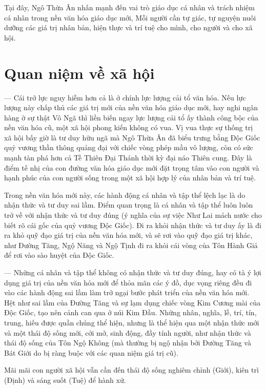 Tại đây, Ngô Thừa Ân nhấn mạnh đến vai trò giáo dục cá nhân và trách nhiệm cá nhân trong nền văn hóa giáo dục mới, Mỗi người cần tự giác, tự nguyện nuôi dưỡng các giá trị nhân bản, hiện thực và trí tuệ cho mình, cho người và cho xã hội.

\section{Quan niệm về xã hội} %
\label{sec:50_51_xa_hoi}

— Cái trở lực nguy hiễm hơn cả là ở chính lực lượng cải tổ văn hóa. Nếu lực lượng này chấp thủ các giá trị mới của nền văn hóa giáo dục mới, hay nghi ngân hàng ờ sự thật Vô Ngã thì liền biến ngay lực lượng cải tổ ấy thành công bộc của nền văn hóa cũ, một xã hội phong kiến không có vua. Vị vua thực sự thống trị xã hội bấy giờ là tư duy hữu ngã mà Ngô Thừa Ân đã biểu trưng bằng Độc Giốc quỷ vương thần thông quảng đại với chiếc vòng phép mầu vô lượng, còn có sức mạnh tàn phá hơn cả Tề Thiên Đại Thánh thời kỳ đại náo Thiên cung. Đây là điểm tế nhị của con đường văn hóa giáo dục mới đặt trọng tâm vào con người và hạnh phúc của con người sống trong một xã hội hợp lý của nhân bản và trí tuệ.

Trong nền văn hóa mới này, các hành động cá nhân và tập thể lệch lạc là do nhận thức và tư duy sai lầm. Điểm quan trọng là cá nhân và tập thể luôn luôn trở về với nhận thức và tư duy đúng (ý nghĩa của sự việc Như Lai mách nước cho biết rõ cái gốc của quỷ vương Độc Giốc). Đi ra khỏi nhận thức và tư duy ấy là đi ra khỏ quỹ đạo giá trị của nền văn hóa mới, và sẽ rơi vào quỹ đạo giá trị khác, như Đường Tăng, Ngộ Năng và Ngộ Tịnh đi ra khỏi cái vòng của Tôn Hành Giả để rơi vào sào huyệt của Độc Giốc.

— Những cá nhân và tập thể không có nhận thức và tư duy đúng, hay có tà ý lợi dụng giá trị của nền văn hóa mới để thỏa mãn các ý đồ, dục vọng riêng đều đi vào các hành động sai lầm làm trở ngại bước phát triển của nền văn hóa mới. Hệt như sai lầm của Đường Tăng và sự lạm dụng chiếc vòng Kim Cương mài của Độc Giốc, tạo nên cảnh can qua ở núi Kim Đầu. Những nhân, nghĩa, lễ, trí, tín, trung, hiếu được quần chúng thể hiện, nhưng là thể hiện qua một nhận thức mới và một thái độ sống mới, cởi mở, sinh động, đầy tính người, như nhận thức và thái độ sống của Tôn Ngộ Không (mà thường bị ngộ nhận bởi Đường Tăng và Bát Giới do bị ràng buộc với các quan niệm giá trị cũ).

Mãi mãi con người xã hội vẫn cần đến thái độ sống nghiêm chỉnh (Giới), kiên trì (Định) và sáng suốt (Tuệ) để hành xử.
